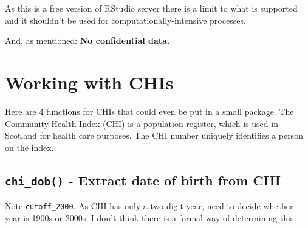 \documentclass[]{book}
\newenvironment{Shaded}{\begin{snugshade}}{\end{snugshade}}
\newcommand{\CommentTok}[1]{\textcolor[rgb]{0.56,0.35,0.01}{\textit{#1}}}
\newcommand{\ControlFlowTok}[1]{\textcolor[rgb]{0.13,0.29,0.53}{\textbf{#1}}}
\newcommand{\DataTypeTok}[1]{\textcolor[rgb]{0.13,0.29,0.53}{#1}}
\newcommand{\DecValTok}[1]{\textcolor[rgb]{0.00,0.00,0.81}{#1}}
\newcommand{\KeywordTok}[1]{\textcolor[rgb]{0.13,0.29,0.53}{\textbf{#1}}}
\newcommand{\NormalTok}[1]{#1}
\newcommand{\OperatorTok}[1]{\textcolor[rgb]{0.81,0.36,0.00}{\textbf{#1}}}
\newcommand{\StringTok}[1]{\textcolor[rgb]{0.31,0.60,0.02}{#1}}
\begin{document}
As this is a free version of RStudio server there is a limit to what is supported and it shouldn't be used for computationally-intensive processes.

And, as mentioned: \textbf{No confidential data.}

\hypertarget{working-with-chis}{%
\section{Working with CHIs}\label{working-with-chis}}

Here are 4 functions for CHIs that could even be put in a small package.
The Community Health Index (CHI) is a population register, which is used in Scotland for health care purposes.
The CHI number uniquely identifies a person on the index.

\hypertarget{chi_dob---extract-date-of-birth-from-chi}{%
\subsection{\texorpdfstring{\texttt{chi\_dob()} - Extract date of birth from CHI}{chi\_dob() - Extract date of birth from CHI}}\label{chi_dob---extract-date-of-birth-from-chi}}

Note \texttt{cutoff\_2000}.
As CHI has only a two digit year, need to decide whether year is 1900s or 2000s.
I don't think there is a formal way of determining this.

\begin{Shaded}
\end{Shaded}
\end{document}
